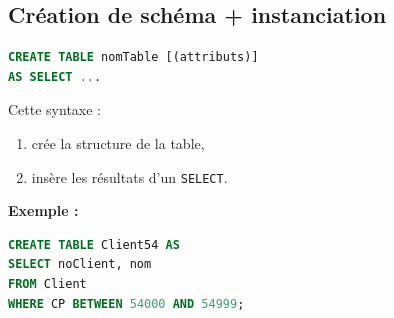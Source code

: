 
\subsection{Création de schéma + instanciation}

\begin{sqlcodebox}
\begin{lstlisting}[language=SQL]
CREATE TABLE nomTable [(attributs)]
AS SELECT ...
\end{lstlisting}
\end{sqlcodebox}

Cette syntaxe :

\begin{enumerate}
\item crée la structure de la table,
\item insère les résultats d’un \texttt{SELECT}.
\end{enumerate}

\textbf{Exemple :}

\begin{sqlcodebox}
\begin{lstlisting}[language=SQL]
CREATE TABLE Client54 AS
SELECT noClient, nom
FROM Client
WHERE CP BETWEEN 54000 AND 54999;
\end{lstlisting}
\end{sqlcodebox}
